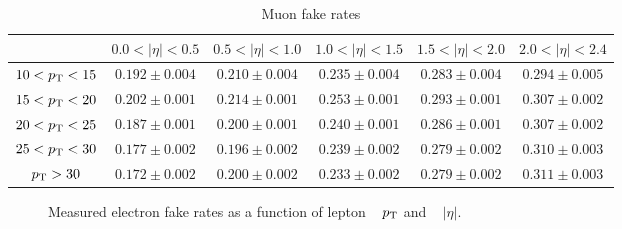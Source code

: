 \begin{table}[!ht]
\centering
\scalebox{0.9}
{
\begin{tabular}{|c|c|c|c|c|c|}
\hline
                & $0.0 < |\eta| < 0.5$ & $0.5 < |\eta| < 1.0$ & $1.0 < |\eta| < 1.5$ & $1.5 < |\eta| < 2.0$ & $2.0 < |\eta| < 2.4$ \\
\hline
$10 < p_{\mathrm{T}} < 15$ &  $0.192 \pm  0.004$  & $ 0.210 \pm  0.004$  &  $0.235 \pm  0.004$  &  $0.283 \pm  0.004$  &  $0.294 \pm  0.005$ \\
\hline
$15 < p_{\mathrm{T}} < 20$ &  $0.202 \pm  0.001$  & $ 0.214 \pm  0.001$  &  $0.253 \pm  0.001$  &  $0.293 \pm  0.001$  &  $0.307 \pm  0.002$ \\
\hline
$20 < p_{\mathrm{T}} < 25$ & $ 0.187 \pm  0.001$  &  $0.200 \pm  0.001$  &  $0.240 \pm  0.001$  &  $0.286 \pm  0.001$  &  $0.307 \pm  0.002$ \\
\hline 
$25 < p_{\mathrm{T}} < 30$ &  $0.177 \pm  0.002$  &  $0.196 \pm  0.002$  &  $0.239 \pm  0.002$  &  $0.279 \pm  0.002$  &  $0.310 \pm  0.003$ \\
\hline
$p_{\mathrm{T}} > 30$      &  $0.172 \pm  0.002$  &  $0.200 \pm  0.002$  &  $0.233 \pm  0.002$  &  $0.279 \pm  0.002$  &  $0.311 \pm  0.003$ \\
\hline    
\end{tabular}   
}
\caption{Muon fake rates}
\label{tab:muon_fr}
\end{table}

\begin{figure}[htbp!]
\begin{center}
  \caption{Measured electron fake rates as a function of lepton ~\protect{} $p_{\mathrm{T}}$ and ~\protect{} $|\eta|$.}
  \label{fig:ele_fr_plots}
\end{center}
\end{figure}

